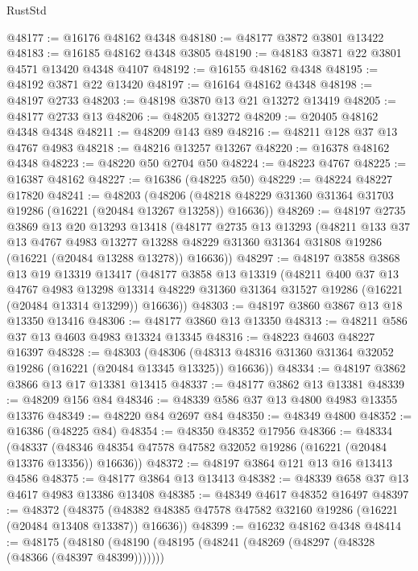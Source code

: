 \begin{lexlean}{RustStd}
\begin{coremodule}
@48177 := @16176 @48162 @4348
@48180 := @48177 @3872 @3801 @13422
@48183 := @16185 @48162 @4348 @3805
@48190 := @48183 @3871 @22 @3801 @4571 @13420 @4348 @4107
@48192 := @16155 @48162 @4348
@48195 := @48192 @3871 @22 @13420
@48197 := @16164 @48162 @4348
@48198 := @48197 @2733
@48203 := @48198 @3870 @13 @21 @13272 @13419
@48205 := @48177 @2733 @13
@48206 := @48205 @13272
@48209 := @20405 @48162 @4348 @4348
@48211 := @48209 @143 @89
@48216 := @48211 @128 @37 @13 @4767 @4983
@48218 := @48216 @13257 @13267
@48220 := @16378 @48162 @4348
@48223 := @48220 @50 @2704 @50
@48224 := @48223 @4767
@48225 := @16387 @48162
@48227 := @16386 (@48225 @50)
@48229 := @48224 @48227 @17820
@48241 := @48203
    (@48206 (@48218 @48229 @31360 @31364 @31703 @19286 (@16221 (@20484 @13267 @13258)) @16636))
@48269 := @48197
    @2735
    @3869
    @13
    @20
    @13293
    @13418
    (@48177
      @2735
      @13
      @13293
      (@48211
        @133
        @37
        @13
        @4767
        @4983
        @13277
        @13288
        @48229
        @31360
        @31364
        @31808
        @19286
        (@16221 (@20484 @13288 @13278))
        @16636))
@48297 := @48197
    @3858
    @3868
    @13
    @19
    @13319
    @13417
    (@48177
      @3858
      @13
      @13319
      (@48211
        @400
        @37
        @13
        @4767
        @4983
        @13298
        @13314
        @48229
        @31360
        @31364
        @31527
        @19286
        (@16221 (@20484 @13314 @13299))
        @16636))
@48303 := @48197 @3860 @3867 @13 @18 @13350 @13416
@48306 := @48177 @3860 @13 @13350
@48313 := @48211 @586 @37 @13 @4603 @4983 @13324 @13345
@48316 := @48223 @4603 @48227 @16397
@48328 := @48303
    (@48306 (@48313 @48316 @31360 @31364 @32052 @19286 (@16221 (@20484 @13345 @13325)) @16636))
@48334 := @48197 @3862 @3866 @13 @17 @13381 @13415
@48337 := @48177 @3862 @13 @13381
@48339 := @48209 @156 @84
@48346 := @48339 @586 @37 @13 @4800 @4983 @13355 @13376
@48349 := @48220 @84 @2697 @84
@48350 := @48349 @4800
@48352 := @16386 (@48225 @84)
@48354 := @48350 @48352 @17956
@48366 := @48334
    (@48337 (@48346 @48354 @47578 @47582 @32052 @19286 (@16221 (@20484 @13376 @13356)) @16636))
@48372 := @48197 @3864 @121 @13 @16 @13413 @4586
@48375 := @48177 @3864 @13 @13413
@48382 := @48339 @658 @37 @13 @4617 @4983 @13386 @13408
@48385 := @48349 @4617 @48352 @16497
@48397 := @48372
    (@48375 (@48382 @48385 @47578 @47582 @32160 @19286 (@16221 (@20484 @13408 @13387)) @16636))
@48399 := @16232 @48162 @4348
@48414 := @48175
    (@48180
      (@48190
        (@48195 (@48241 (@48269 (@48297 (@48328 (@48366 (@48397 @48399)))))))

\end{coremodule}
\end{lexlean}
